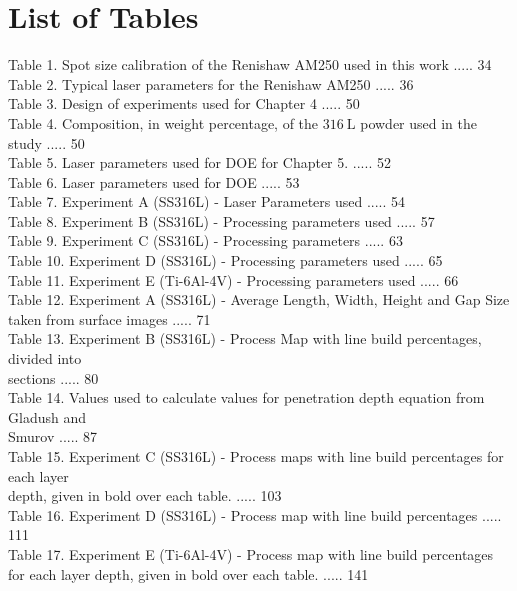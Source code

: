 \documentclass[10pt]{article}
\begin{document}
\section*{List of Tables}
Table 1. Spot size calibration of the Renishaw AM250 used in this work ..... 34\\
Table 2. Typical laser parameters for the Renishaw AM250 ..... 36\\
Table 3. Design of experiments used for Chapter 4 ..... 50\\
Table 4. Composition, in weight percentage, of the $316 \mathrm{~L}$ powder used in the study ..... 50\\
Table 5. Laser parameters used for DOE for Chapter 5. ..... 52\\
Table 6. Laser parameters used for DOE ..... 53\\
Table 7. Experiment A (SS316L) - Laser Parameters used ..... 54\\
Table 8. Experiment B (SS316L) - Processing parameters used ..... 57\\
Table 9. Experiment C (SS316L) - Processing parameters ..... 63\\
Table 10. Experiment D (SS316L) - Processing parameters used ..... 65\\
Table 11. Experiment E (Ti-6Al-4V) - Processing parameters used ..... 66\\
Table 12. Experiment A (SS316L) - Average Length, Width, Height and Gap Size taken from surface images ..... 71\\
Table 13. Experiment B (SS316L) - Process Map with line build percentages, divided into\\
sections ..... 80\\
Table 14. Values used to calculate values for penetration depth equation from Gladush and\\
Smurov ..... 87\\
Table 15. Experiment C (SS316L) - Process maps with line build percentages for each layer\\
depth, given in bold over each table. ..... 103\\
Table 16. Experiment D (SS316L) - Process map with line build percentages ..... 111\\
Table 17. Experiment E (Ti-6Al-4V) - Process map with line build percentages for each layer depth, given in bold over each table. ..... 141
\end{document}
